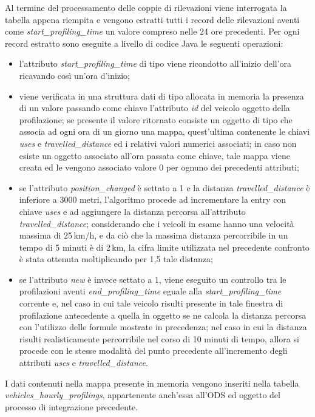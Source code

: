 Al termine del processamento delle coppie di rilevazioni viene interrogata la tabella
appena riempita e vengono estratti tutti i record delle rilevazioni aventi come
\textit{start\_profiling\_time} un valore compreso nelle 24 ore precedenti.
Per ogni record estratto sono eseguite a livello di codice Java le seguenti
operazioni:
\begin{itemize}
\item l'attributo \textit{start\_profiling\_time} di tipo  viene
ricondotto all'inizio dell'ora ricavando così un'ora d'inizio;
\item viene verificata in una struttura dati di tipo  allocata in
memoria la presenza di un valore passando come chiave l'attributo \textit{id}
del veicolo oggetto della profilazione; se presente il valore ritornato consiste un
oggetto di tipo  che associa ad ogni ora di un giorno una mappa,
quest'ultima contenente le chiavi \textit{uses} e \textit{travelled\_distance}
ed i relativi valori numerici associati; in caso non esiste un oggetto associato
all'ora passata come chiave, tale mappa viene creata ed le vengono associato
valore 0 per ognuno dei precedenti attributi;
\item se l'attributo \textit{position\_changed} è settato a 1 e la distanza
\textit{travelled\_distance} è inferiore a 3000 metri, l'algoritmo procede
ad incrementare la entry con chiave \textit{uses} e ad aggiungere la distanza
percorsa all'attributo \textit{travelled\_distance}; considerando che i veicoli
in esame hanno una velocità massima di 25\,km/h, e da ciò che la massima distanza
percorribile in un tempo di 5 minuti è di 2\,km, la cifra limite utilizzata nel
precedente confronto è stata ottenuta moltiplicando per 1,5 tale distanza;
\item se l'attributo \textit{new} è invece settato a 1, viene eseguito
un controllo tra le profilazioni aventi \textit{end\_profiling\_time} eguale
alla \textit{start\_profiling\_time} corrente e, nel caso in cui tale veicolo
risulti presente in tale finestra di profilazione antecedente a quella in oggetto
se ne calcola la distanza percorsa con l'utilizzo delle formule mostrate in
precedenza; nel caso in cui la distanza risulti realisticamente percorribile
nel corso di 10 minuti di tempo, allora si procede con le stesse modalità
del punto precedente all'incremento degli attributi \textit{uses} e
\textit{travelled\_distance}.
\end{itemize}
I dati contenuti nella mappa presente in memoria vengono inseriti nella
tabella \textit{vehicles\_hourly\_profilings}, appartenente anch'essa all'ODS
ed oggetto del processo di integrazione precedente.

